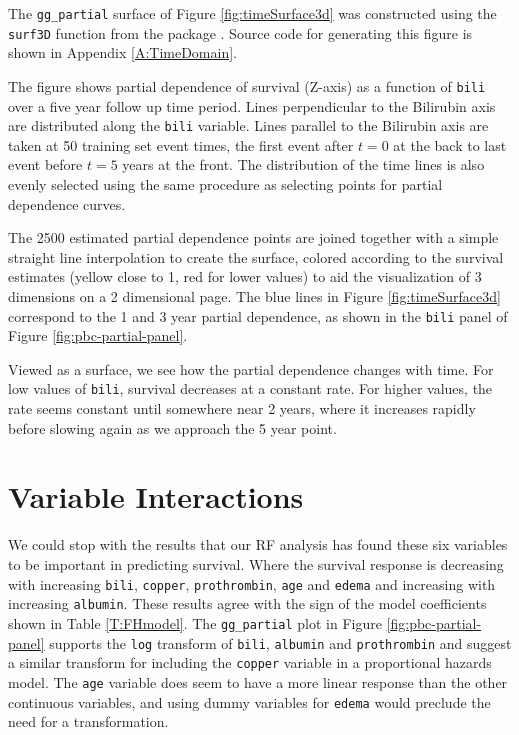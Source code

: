 \documentclass[article]{jss}
\begin{document}
The \texttt{gg\_partial} surface of Figure \ref{fig:timeSurface3d} was
constructed using the \texttt{surf3D} function from the 
package
\citep[\url{http://CRAN.R-project.org/package=plot3D}]{plot3D:2014}.
Source code for generating this figure is shown in Appendix
\ref{A:TimeDomain}.

The figure shows partial dependence of survival (Z-axis) as a function
of \texttt{bili} over a five year follow up time period. Lines
perpendicular to the Bilirubin axis are distributed along the
\texttt{bili} variable. Lines parallel to the Bilirubin axis are taken
at 50 training set event times, the first event after \(t=0\) at the
back to last event before \(t=5\) years at the front. The distribution
of the time lines is also evenly selected using the same procedure as
selecting points for partial dependence curves.

The 2500 estimated partial dependence points are joined together with a
simple straight line interpolation to create the surface, colored
according to the survival estimates (yellow close to 1, red for lower
values) to aid the visualization of 3 dimensions on a 2 dimensional
page. The blue lines in Figure \ref{fig:timeSurface3d} correspond to the
1 and 3 year partial dependence, as shown in the \texttt{bili} panel of
Figure \ref{fig:pbc-partial-panel}.

Viewed as a surface, we see how the partial dependence changes with
time. For low values of \texttt{bili}, survival decreases at a constant
rate. For higher values, the rate seems constant until somewhere near 2
years, where it increases rapidly before slowing again as we approach
the 5 year point.

\section{Variable Interactions}\label{variable-interactions}

We could stop with the results that our RF analysis has found these six
variables to be important in predicting survival. Where the survival
response is decreasing with increasing \texttt{bili}, \texttt{copper},
\texttt{prothrombin}, \texttt{age} and \texttt{edema} and increasing
with increasing \texttt{albumin}. These results agree with the sign of
the \cite{fleming:1991} model coefficients shown in Table
\ref{T:FHmodel}. The \texttt{gg\_partial} plot in Figure
\ref{fig:pbc-partial-panel} supports the \texttt{log} transform of
\texttt{bili}, \texttt{albumin} and \texttt{prothrombin} and suggest a
similar transform for including the \texttt{copper} variable in a
proportional hazards model. The \texttt{age} variable does seem to have
a more linear response than the other continuous variables, and using
dummy variables for \texttt{edema} would preclude the need for a
transformation.
\end{document}
